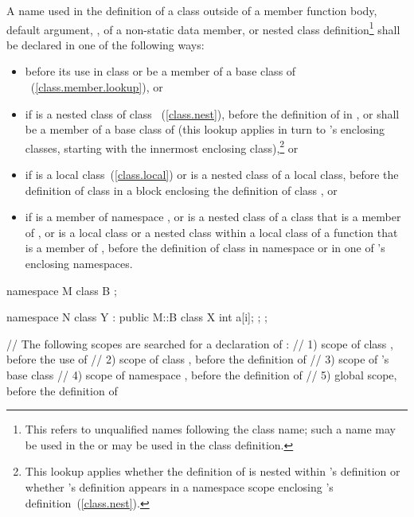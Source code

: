 \pnum
A name used in the definition of a class  outside of a member
function body, default argument, ,
 of a non-static data member,
or nested class definition\footnote{This refers to unqualified names
following the class name; such a name may be used in the
 or may be used in the class definition.}
shall be declared in one of the following ways:
\begin{itemize}
\item before its use in class  or be a member of a base class
of ~(\ref{class.member.lookup}), or
\item if  is a nested class of class
~(\ref{class.nest}), before the definition of  in
, or shall be a member of a base class of  (this
lookup applies in turn to 's enclosing classes, starting with
the innermost enclosing class),\footnote{This lookup applies whether the
definition of  is
nested within 's definition or whether 's definition
appears in a namespace scope enclosing 's
definition~(\ref{class.nest}).}
or
\item if  is a local class~(\ref{class.local}) or is a nested
class of a local class, before the definition of class  in a
block enclosing the definition of class , or
\item if  is a member of namespace , or is a nested
class of a class that is a member of , or is a local class or a
nested class within a local class of a function that is a member of
, before the definition of class  in namespace
 or in one of 's enclosing namespaces.
\end{itemize}
\begin{example}
\begin{codeblock}
namespace M {
  class B { };
}

\end{codeblock}
\begin{codeblock}
namespace N {
  class Y : public M::B {
    class X {
      int a[i];
    };
  };
}

// The following scopes are searched for a declaration of :
// 1) scope of class , before the use of 
// 2) scope of class , before the definition of 
// 3) scope of 's base class 
// 4) scope of namespace , before the definition of 
// 5) global scope, before the definition of 
\end{codeblock}
\end{example}
